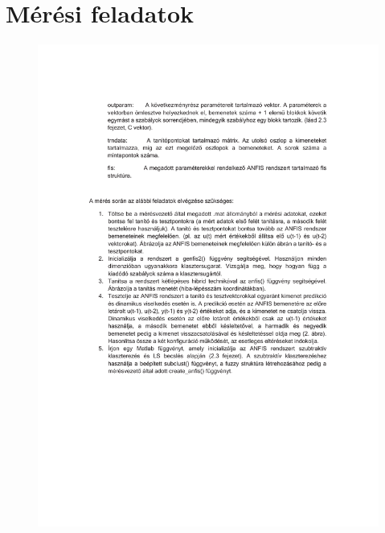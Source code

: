 \chapter{Mérési feladatok}\label{sect:LatexTools}

\begin{figure}[!ht]
	\includegraphics[trim = 30mm 80mm 30mm 103mm,clip, width=150mm,keepaspectratio]{figures/feladatok_m05.pdf}
	\label{fig:Road-of-a-char}
\end{figure}
